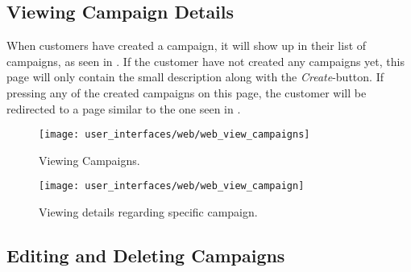 \subsection{Viewing Campaign Details}

When customers have created a campaign, it will show up in their list of campaigns, as seen in . If the customer have not created any campaigns yet, this page will only contain the small description along with the \emph{Create}-button. If pressing any of the created campaigns on this page, the customer will be redirected to a page similar to the one seen in .  

\begin{figure}[!htbp]
\centering
\texttt{[image: user\_interfaces/web/web\_view\_campaigns]}
\caption{Viewing Campaigns.}
\label{fig:web_view_campaigns}
\end{figure}
\FloatBarrier

\begin{figure}[!htbp]
\centering
\texttt{[image: user\_interfaces/web/web\_view\_campaign]}
\caption{Viewing details regarding specific campaign.}
\label{fig:web_view_campaign}
\end{figure}
\FloatBarrier

\subsection{Editing and Deleting Campaigns}


